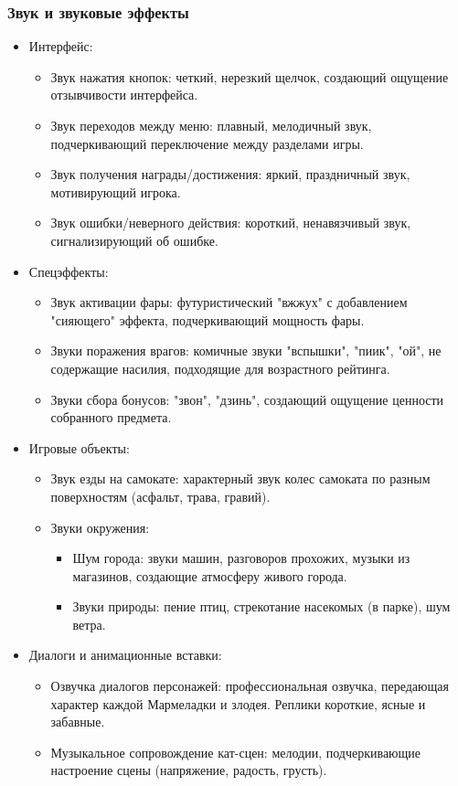 \documentclass[article,12pt, fleqn]{article}
\begin{document}
\begin{itemize}
\subsubsection{Звук и звуковые эффекты}
\begin{itemize}
    \item Интерфейс:
    \begin{itemize}
        \item Звук нажатия кнопок: четкий, нерезкий щелчок, создающий ощущение отзывчивости интерфейса.
        \item Звук переходов между меню: плавный, мелодичный звук, подчеркивающий переключение между разделами игры.
        \item Звук получения награды/достижения: яркий, праздничный звук, мотивирующий игрока.
        \item Звук ошибки/неверного действия: короткий, ненавязчивый звук, сигнализирующий об ошибке.
    \end{itemize}
    \item Спецэффекты:
    \begin{itemize}
        \item Звук активации фары: футуристический "вжжух" с добавлением "сияющего" эффекта, подчеркивающий мощность фары.
        \item Звуки поражения врагов: комичные звуки "вспышки", "пиик", "ой", не содержащие насилия, подходящие для возрастного рейтинга.
        \item Звуки сбора бонусов: "звон", "дзинь", создающий ощущение ценности собранного предмета.
    \end{itemize}
    \item Игровые объекты:
    \begin{itemize}
        \item Звук езды на самокате: характерный звук колес самоката по разным поверхностям (асфальт, трава, гравий).
        \item Звуки окружения:
        \begin{itemize}
            \item Шум города: звуки машин, разговоров прохожих, музыки из магазинов, создающие атмосферу живого города.
            \item Звуки природы: пение птиц, стрекотание насекомых (в парке), шум ветра.
        \end{itemize}
    \end{itemize}
    \item Диалоги и анимационные вставки: 
    \begin{itemize}
        \item Озвучка диалогов персонажей: профессиональная озвучка, передающая характер каждой Мармеладки и злодея. Реплики короткие, ясные и забавные.
        \item Музыкальное сопровождение кат-сцен: мелодии, подчеркивающие настроение сцены (напряжение, радость, грусть).
    \end{itemize}
\end{itemize}

\end{itemize}
\end{document}
